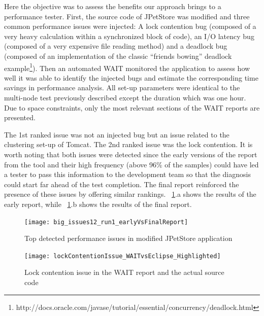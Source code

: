 \documentclass[runningheads,a4paper]{llncs}
\begin{document}
Here the objective was to assess the benefits our approach brings to a
performance tester. First, the source code of JPetStore was modified and three
common performance issues were injected: A lock contention bug (composed of a
very heavy calculation within a synchronized block of code), an I/O latency bug
(composed of a very expensive file reading method) and a deadlock bug (composed of an implementation of the classic ``friends bowing'' deadlock
example\footnote{http://docs.oracle.com/javase/tutorial/essential/concurrency/deadlock.html}).
Then an automated WAIT monitored the application to assess how well it was able
to identify the injected bugs and estimate the corresponding time savings in performance
analysis. All set-up parameters were identical to the multi-node test previously 
described except the duration which was one hour. Due to space
constraints, only the most relevant sections of the WAIT reports are presented.

The 1st ranked issue was not an injected bug but an issue related to the
clustering set-up of Tomcat.
The 2nd ranked issue was the lock
contention. It is worth noting that both issues were
detected since the early versions of the report from the tool and their
high frequency (above 96\% of the samples) could have led a tester to pass this
information to the development team so that the diagnosis could start far ahead
of the test completion. The final report reinforced the presence of these issues 
by offering similar rankings. \figurename ~\ref{fig_run1_bugs12}.a shows the
results of the early report, while ~\ref{fig_run1_bugs12}.b shows the results of 
the final report.

\begin{figure}[!h]
\centering
\texttt{[image: big\_issues12\_run1\_earlyVsFinalReport]}
\caption{Top detected performance issues in modified JPetStore application}
\label{fig_run1_bugs12}
\end{figure}

\begin{figure}[!h]
\centering
\texttt{[image: lockContentionIssue\_WAITvsEclipse\_Highlighted]}
\caption{Lock contention issue in the WAIT report and the actual source code}
\label{fig_issue2_vs_code}
\end{figure}
\end{document}
